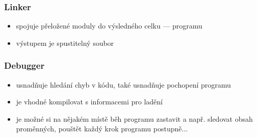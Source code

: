 \subsubsection*{Linker}
\begin{itemize}
	\item spojuje přeložené moduly do výsledného celku --- programu
	\item výstupem je spustitelný soubor
\end{itemize}

\subsubsection*{Debugger}
\begin{itemize}
	\item usnadňuje hledání chyb v kódu, také usnadňuje pochopení programu
	\item je vhodné kompilovat s informacemi pro ladění
	\item je možné si na nějakém místě běh programu zastavit a např. sledovat obsah proměnných, pouštět každý krok programu postupně...
\end{itemize}
